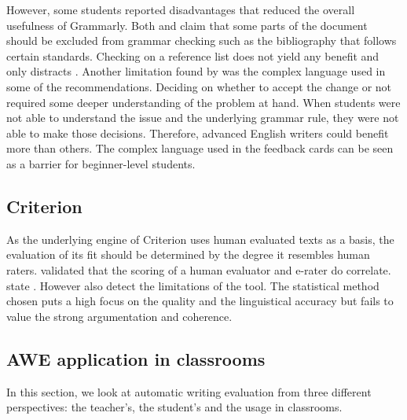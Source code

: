 \documentclass[runningheads]{llncs}
\let\OldTextregistered\textregistered
\renewcommand{\textregistered}{\OldTextregistered\xspace}
\begin{document}
However, some students reported disadvantages that reduced the overall usefulness of Grammarly\textregistered. Both \textcite{ventayen_graduate_2018} and  \textcite{nova_utilizing_2018} claim that some parts of the document should be excluded from grammar checking such as the bibliography that follows certain standards. Checking on a reference list does not yield any benefit and only distracts \citep{ventayen_graduate_2018, nova_utilizing_2018}. Another limitation found by \textcite{cavaleri_you_2016} was the complex language used in some of the recommendations. Deciding on whether to accept the change or not required some deeper understanding of the problem at hand. When students were not able to understand the issue and the underlying grammar rule, they were not able to make those decisions. Therefore, advanced English writers could benefit more than others. The complex language used in the feedback cards can be seen as a barrier for beginner-level students. 

\subsection{Criterion\textregistered}
As the underlying engine of Criterion\textregistered uses human evaluated texts as a basis, the evaluation of its fit should be determined by the degree it resembles human raters. \textcite{weigle_validation_2010} validated that the scoring of a human evaluator and e-rater\textregistered do correlate. \citeauthor{lim_review_2012} state . However \textcite{lim_review_2012} also detect the limitations of the tool. The statistical method chosen puts a high focus on the quality and the linguistical accuracy but fails to value the strong argumentation and coherence. 

\subsection{AWE application in classrooms}
In this section, we look at automatic writing evaluation from three different perspectives: the teacher's, the student's and the usage in classrooms. 
\end{document}

